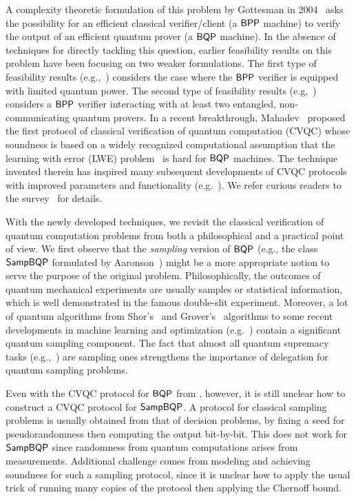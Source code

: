 A complexity theoretic formulation of this problem by Gottesman in 2004~\cite{web:Aaronson} asks the possibility for an efficient classical verifier/client (a $\operatorname{\mathsf{BPP}}$ machine) to verify the output of an
efficient quantum prover (a $\operatorname{\mathsf{BQP}}$ machine).
In the absence of techniques for directly tackling this question, earlier feasibility results on this problem have been focusing on two weaker formulations.
The first type of feasibility results (e.g.,~\cite{BFK09,arXiv:ABOEM17,FK17,mf16}) considers the case where the $\operatorname{\mathsf{BPP}}$ verifier is equipped with limited quantum power.
The second type of feasibility results (e.g,~\cite{Nat:RUV13, CGJV19, Gheorghiu_2015, HPF15})
considers a $\operatorname{\mathsf{BPP}}$ verifier interacting with at least two entangled, non-communicating quantum provers.
In a recent breakthrough, Mahadev~\cite{FOCS:Mahadev18a} proposed the first protocol of classical verification of quantum computation (CVQC) whose soundness is based on a widely recognized computational assumption that the learning with error (LWE) problem~\cite{JACM:Regev09} is hard for $\operatorname{\mathsf{BQP}}$ machines.
The technique invented therein has inspired many  subsequent developments of CVQC protocols with improved parameters and functionality (e.g.~\cite{FOCS:GheVid19,arXiv:AlaChiHun19,arXiv:ChiaChungYam19}).
We refer curious readers to the survey~\cite{survey:GKK19} for details.

With the newly developed techniques, we revisit the classical verification of quantum computation problems from both a philosophical and a practical point of view.
We first observe that the \emph{sampling} version of $\operatorname{\mathsf{BQP}}$ (e.g., the class $\operatorname{\mathsf{SampBQP}}$ formulated by Aaronson~\cite{aaronson_2013}) might be a more appropriate notion to serve the purpose of the original problem.
Philosophically, the outcomes of quantum mechanical experiments are usually samples or statistical information, which is well demonstrated in the famous double-slit experiment.
Moreover, a lot of quantum algorithms from Shor's~\cite{Shor} and Grover's~\cite{Grover} algorithms to some recent developments in machine learning and optimization (e.g.~\cite{brando_et_al:LIPIcs:2019:10603, AGGW17,pmlr-v97-li19b}) contain a significant quantum sampling component.
The fact that almost all quantum supremacy tasks (e.g.,~\cite{Boson, IQP, nature-google}) are sampling ones strengthens the importance of delegation for quantum sampling problems.

Even with the CVQC protocol for $\operatorname{\mathsf{BQP}}$ from \cite{FOCS:Mahadev18a}, however,
it is still unclear how to construct a CVQC protocol for $\operatorname{\mathsf{SampBQP}}$.
A protocol for classical sampling problems is usually obtained from that of decision problems,
by fixing a seed for pseudorandomness then computing the output bit-by-bit.
This does not work for $\operatorname{\mathsf{SampBQP}}$ since randomness from quantum computations arises from measurements.
Additional challenge comes from modeling and achieving soundness for such a sampling protocol,
since it is unclear how to apply the usual trick of running many copies of the protocol then applying the Chernoff bound.

